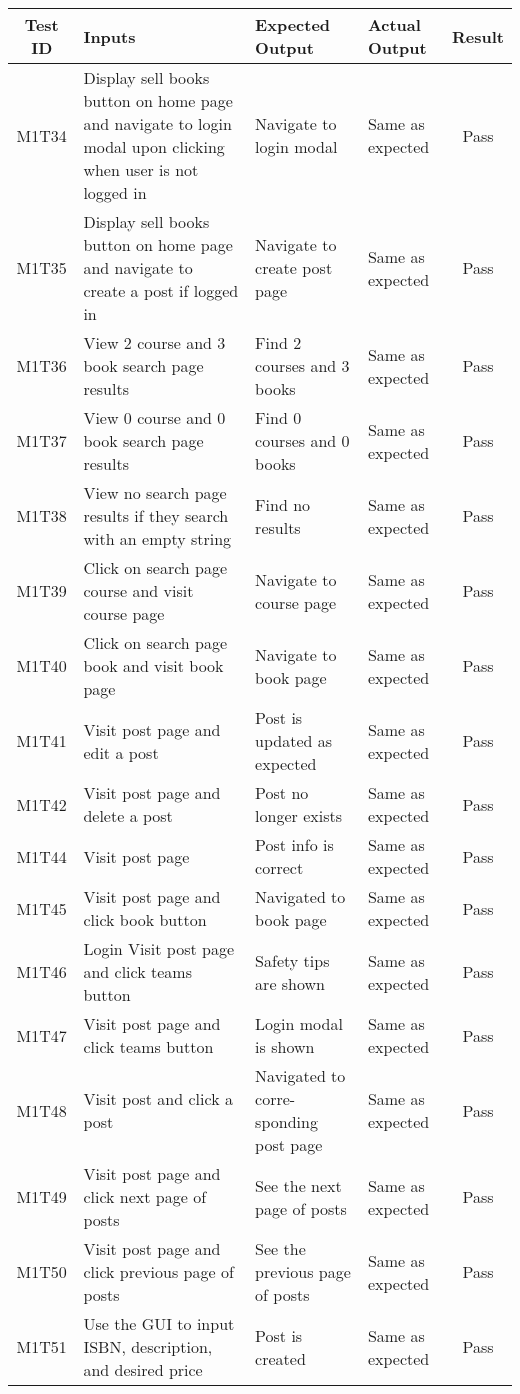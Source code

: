 \documentclass[fullpage]{article}
\begin{document}
\begin{table}[H]
\flushleft
\begin{tabular}{|c|p{4.5cm}|p{3.6cm}|p{3.6cm}|c|}
\hline
 \rowcolor{lightgray}
\textbf{Test ID} &\textbf{Inputs} &\textbf{Expected Output} &\textbf{Actual Output} &\textbf{Result}\\
\hline
M1T34 & Display sell books button on home page and navigate to login modal upon clicking when user is not logged in & Navigate to login modal & Same as expected & Pass \\
\hline
M1T35 & Display sell books button on home page and navigate to create a post if logged in & Navigate to create post page & Same as expected & Pass \\
\hline
M1T36 & View 2 course and 3 book search page results & Find 2 courses and 3 books & Same as expected & Pass \\
\hline
M1T37 & View 0 course and 0 book search page results & Find 0 courses and 0 books & Same as expected & Pass \\
\hline
M1T38 & View no search page results if they search with an empty string & Find no results & Same as expected & Pass \\
\hline
M1T39 & Click on search page course and visit course page & Navigate to course page & Same as expected & Pass \\
\hline
M1T40 & Click on search page book and visit book page & Navigate to book page & Same as expected & Pass \\
\hline
M1T41 & Visit post page and edit a post & Post is updated as expected & Same as expected & Pass \\
\hline
M1T42 & Visit post page and delete a post & Post no longer exists & Same as expected & Pass \\
\hline
M1T44 & Visit post page & Post info is correct & Same as expected & Pass \\
\hline
M1T45 & Visit post page and click book button & Navigated to book page & Same as expected & Pass \\
\hline
M1T46 & Login Visit post page and click teams button & Safety tips are shown & Same as expected & Pass \\
\hline
M1T47 & Visit post page and click teams button & Login modal is shown & Same as expected & Pass \\
\hline
M1T48 & Visit post and click a
post & Navigated to corre-
sponding post page & Same as expected & Pass \\
\hline
M1T49 & Visit post page and click
next page of posts & See the next page of
posts & Same as expected & Pass \\
\hline
M1T50 & Visit post page and click
previous page of posts & See the previous page of
posts & Same as expected & Pass \\
\hline
M1T51 & Use the GUI to input ISBN, description, and desired price & Post is created & Same as expected & Pass \\
\hline


\end{tabular}
\end{table}
\end{document}
